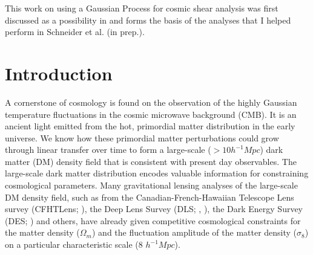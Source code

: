  
This work on using a Gaussian Process for cosmic shear analysis 
was first discussed as a possibility in  \citep{Schneider2014}  and 
forms the basis of the analyses that I helped perform 
in Schneider et al. (in prep.). 

\section{Introduction} 

A cornerstone of cosmology is found on the 
observation of the highly Gaussian temperature fluctuations in the cosmic microwave 
background (CMB). It is an ancient light emitted from the hot, primordial matter 
distribution in the early universe. 
We know how these primordial matter perturbations could grow 
through linear transfer over time to form a large-scale ($> 10 h^{-1} Mpc$) 
dark matter (DM) density field that is consistent with present
day observables. The large-scale dark matter distribution  
 encodes valuable information for constraining cosmological
parameters. Many gravitational lensing analyses of the large-scale DM density 
field, such as from
the Canadian-French-Hawaiian Telescope Lens survey (CFHTLens;
\citealt{Kilbinger2013}), the Deep Lens Survey
(DLS; \citealt{Jee2013a}, \citealt{Wittman2002}), the Dark Energy Survey 
(DES; \citealt{Abbott2016}) and others, 
have already given competitive cosmological constraints for 
 the matter density ($\Omega_m$) and the fluctuation amplitude 
of the matter density ($\sigma_8$) on a particular characteristic scale (8
$h^{-1} Mpc$). 


